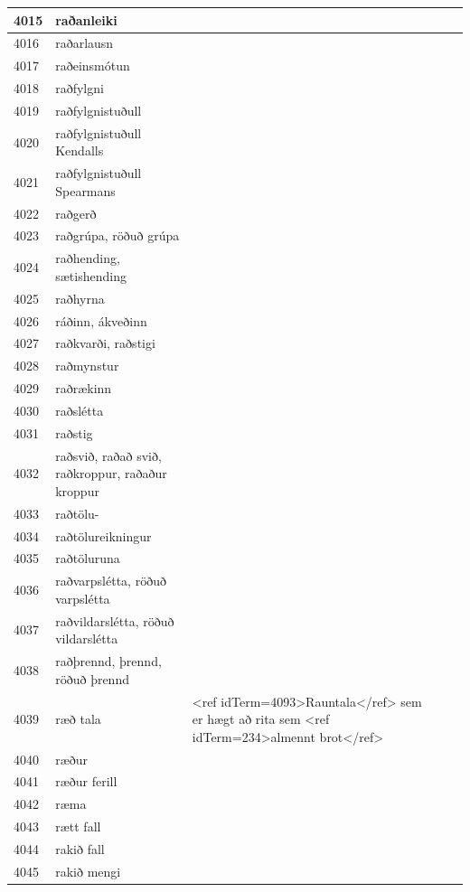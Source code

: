 \begin{longtable}{p{}|p{}|p{}|p{}|p{}}
\hline
4015 & raðanleiki &  &  &  \\
\hline
4016 & raðarlausn &  &  &  \\
\hline
4017 & raðeinsmótun &  &  &  \\
\hline
4018 & raðfylgni &  &  &  \\
\hline
4019 & raðfylgnistuðull &  &  &  \\
\hline
4020 & raðfylgnistuðull Kendalls &  &  &  \\
\hline
4021 & raðfylgnistuðull Spearmans &  &  &  \\
\hline
4022 & raðgerð &  &  &  \\
\hline
4023 & raðgrúpa, röðuð grúpa &  &  &  \\
\hline
4024 & raðhending, sætishending &  &  &  \\
\hline
4025 & raðhyrna &  &  &  \\
\hline
4026 & ráðinn, ákveðinn &  &  &  \\
\hline
4027 & raðkvarði, raðstigi &  &  &  \\
\hline
4028 & raðmynstur &  &  &  \\
\hline
4029 & raðrækinn &  &  &  \\
\hline
4030 & raðslétta &  &  &  \\
\hline
4031 & raðstig &  &  &  \\
\hline
4032 & raðsvið, raðað svið, raðkroppur, raðaður kroppur &  &  &  \\
\hline
4033 & raðtölu- &  &  &  \\
\hline
4034 & raðtölureikningur &  &  &  \\
\hline
4035 & raðtöluruna &  &  &  \\
\hline
4036 & raðvarpslétta, röðuð varpslétta &  &  &  \\
\hline
4037 & raðvildarslétta, röðuð vildarslétta &  &  &  \\
\hline
4038 & raðþrennd, þrennd, röðuð þrennd &  &  &  \\
\hline
4039 & ræð tala & <ref idTerm=4093>Rauntala</ref> sem er hægt að rita sem <ref idTerm=234>almennt brot</ref> &  &  \\
\hline
4040 & ræður &  &  &  \\
\hline
4041 & ræður ferill &  &  &  \\
\hline
4042 & ræma &  &  &  \\
\hline
4043 & rætt fall &  &  &  \\
\hline
4044 & rakið fall &  &  &  \\
\hline
4045 & rakið mengi &  &  &  \\

\end{longtable}
